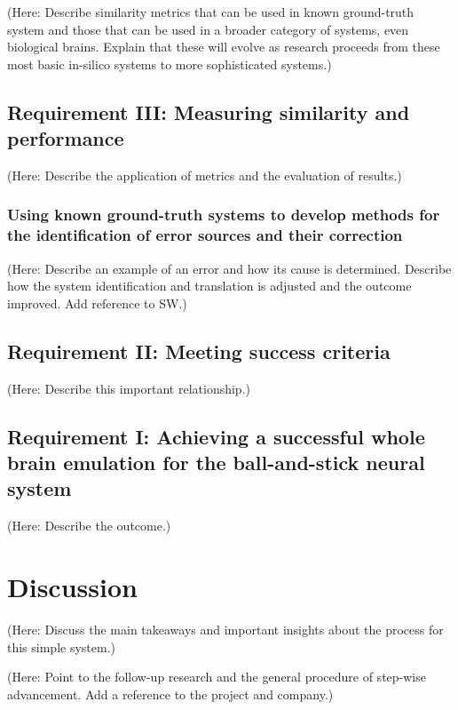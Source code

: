 \documentclass{ldr-article}
\begin{document}
(Here: Describe similarity metrics that can be used in known ground-truth system and those that can be used in a broader category of systems, even biological brains. Explain that these will evolve as research proceeds from these most basic in-silico systems to more sophisticated systems.)

\subsection{Requirement III: Measuring similarity and performance}

(Here: Describe the application of metrics and the evaluation of results.)

\subsubsection{Using known ground-truth systems to develop methods for the identification of error sources and their correction}

(Here: Describe an example of an error and how its cause is determined. Describe how the system identification and translation is adjusted and the outcome improved. Add reference to SW.)

\subsection{Requirement II: Meeting success criteria}

(Here: Describe this important relationship.)

\subsection{Requirement I: Achieving a successful whole brain emulation for the ball-and-stick neural system}

(Here: Describe the outcome.)

\section{Discussion}

(Here: Discuss the main takeaways and important insights about the process for this simple system.)

(Here: Point to the follow-up research and the general procedure of step-wise advancement. Add a reference to the project and company.)


\nocite{other2019references,kramer2019why,phillips2018yarrr}
\end{document}
